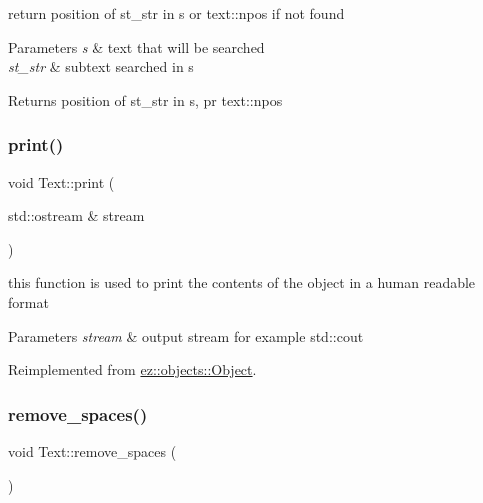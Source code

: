 return position of st\+\_\+str in s or text\+::npos if not found 
\begin{DoxyParams}{Parameters}
{\em s} & text that will be searched \\
\hline
{\em st\+\_\+str} & subtext searched in s \\
\hline
\end{DoxyParams}
\begin{DoxyReturn}{Returns}
position of st\+\_\+str in s, pr text\+::npos 
\end{DoxyReturn}
\mbox{\label{classez_1_1objects_1_1Text_a3c101a7589871f8fd44117a9f13a159d}} 
\subsubsection{\texorpdfstring{print()}{print()}}
{\footnotesize\ttfamily void Text\+::print (\begin{DoxyParamCaption}\item[{std\+::ostream \&}]{stream }\end{DoxyParamCaption})\hspace{0.3cm}{\ttfamily [virtual]}}

this function is used to print the contents of the object in a human readable format 
\begin{DoxyParams}{Parameters}
{\em stream} & output stream for example std\+::cout \\
\hline
\end{DoxyParams}


Reimplemented from \hyperlink{classez_1_1objects_1_1Object_a9e20f39a78163f67f000576149d858b3}{ez\+::objects\+::\+Object}.

\mbox{\label{classez_1_1objects_1_1Text_aa88b2079bd804dd601d95d889c806d07}} 
\subsubsection{\texorpdfstring{remove\+\_\+spaces()}{remove\_spaces()}}
{\footnotesize\ttfamily void Text\+::remove\+\_\+spaces (\begin{DoxyParamCaption}{ }\end{DoxyParamCaption})}

